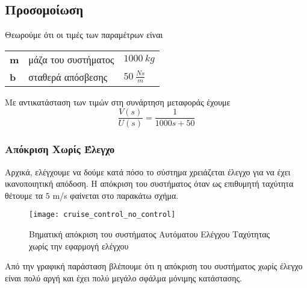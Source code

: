 \subsection{Προσομοίωση}
\noindent
Θεωρούμε ότι οι τιμές των παραμέτρων είναι
\begin{flushleft}
\begin{tabular}{lll}
\textbf{m} & μάζα του συστήματος & $1000\ kg$ \\
\textbf{b} & σταθερά απόσβεσης & $50\ \frac{Ns}{m}$
\end{tabular}
\end{flushleft}
Με αντικατάσταση των τιμών στη συνάρτηση μεταφοράς έχουμε
\begin{equation}
\frac{V(s)}{U(s)} = \frac{1}{1000s+50}
\end{equation}

\subsubsection{Απόκριση Χωρίς Έλεγχο}

Αρχικά, ελέγχουμε να δούμε κατά πόσο το σύστημα χρειάζεται έλεγχο για να έχει ικανοποιητική απόδοση. Η απόκριση του συστήματος όταν ως επιθυμητή ταχύτητα θέτουμε τα $5$ m/s φαίνεται στο παρακάτω σχήμα.

\begin{figure}[h]
  \centering
  \texttt{[image: cruise\_control\_no\_control]}
  \caption{Βηματική απόκριση του συστήματος Αυτόματου Ελέγχου Ταχύτητας χωρίς την εφαρμογή ελέγχου}
  \label{fig:cruise_control_no_control}
\end{figure}

Από την γραφική παράσταση βλέπουμε ότι η απόκριση του συστήματος χωρίς έλεγχο είναι πολύ αργή και έχει πολύ μεγάλο σφάλμα μόνιμης κατάστασης. 

%
%

